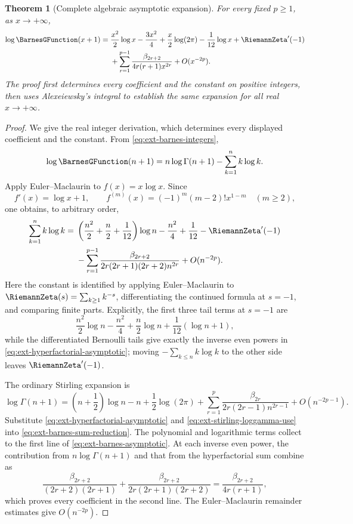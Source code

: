 \documentclass[11pt,a4paper,oneside,openany]{book}
\newtheorem{theorem}{Theorem}[chapter]
\theoremstyle{definition}
\theoremstyle{remark}
\begin{document}
\begin{theorem}[Complete algebraic asymptotic expansion]
\label{thm:ext-barnes-asymptotic}
For every fixed \(p\ge1\), as \(x\to+\infty\),
\begin{align}
 \log \BarnesGFunction(x+1)={}&\frac{x^2}{2}\log x-\frac{3x^2}{4}
 +\frac{x}{2}\log(2\pi)-\frac1{12}\log x+\RiemannZeta'(-1)
 \notag\\
 &+\sum_{r=1}^{p-1}
 \frac{\beta_{2r+2}}{4r(r+1)x^{2r}}
 +O(x^{-2p}).
 \label{eq:ext-barnes-asymptotic}
\end{align}
The proof first determines every coefficient and the constant on positive
integers, then uses Alexeiewsky's integral to establish the same expansion for
all real \(x\to+\infty\).
\end{theorem}
\begin{proof}
We give the real integer derivation, which determines every displayed
coefficient and the constant.  From \eqref{eq:ext-barnes-integers},
\begin{equation}\label{eq:ext-barnes-sum-reduction}
 \log \BarnesGFunction(n+1)=n\log\Gamma(n+1)-\sum_{k=1}^{n}k\log k.
\end{equation}
Apply Euler--Maclaurin to \(f(x)=x\log x\).  Since
\[
 f'(x)=\log x+1,
 \qquad
 f^{(m)}(x)=(-1)^m(m-2)!x^{1-m}\quad(m\ge2),
\]
one obtains, to arbitrary order,
\begin{align}
 \sum_{k=1}^{n}k\log k
 ={}&\left(\frac{n^2}{2}+\frac n2+\frac1{12}\right)\log n
 -\frac{n^2}{4}+\frac1{12}-\RiemannZeta'(-1)
 \notag\\
 &-\sum_{r=1}^{p-1}
 \frac{\beta_{2r+2}}{2r(2r+1)(2r+2)n^{2r}}
 +O(n^{-2p}).
 \label{eq:ext-hyperfactorial-asymptotic}
\end{align}
Here the constant is identified by applying Euler--Maclaurin to
\(\RiemannZeta(s)=\sum_{k\ge1}k^{-s}\), differentiating the continued formula at
\(s=-1\), and comparing finite parts.  Explicitly, the first three tail terms
at \(s=-1\) are
\[
 \frac{n^2}{2}\log n-\frac{n^2}{4}
 +\frac n2\log n+\frac1{12}(\log n+1),
\]
while the differentiated Bernoulli tails give exactly the inverse even powers
in \eqref{eq:ext-hyperfactorial-asymptotic}; moving
\(-\sum_{k\le n}k\log k\) to the other side leaves \(\RiemannZeta'(-1)\).

The ordinary Stirling expansion is
\begin{equation}\label{eq:ext-stirling-loggamma-use}
 \log\Gamma(n+1)=\left(n+\frac12\right)\log n-n
 +\frac12\log(2\pi)
 +\sum_{r=1}^{p}\frac{\beta_{2r}}{2r(2r-1)n^{2r-1}}
 +O(n^{-2p-1}).
\end{equation}
Substitute \eqref{eq:ext-hyperfactorial-asymptotic} and
\eqref{eq:ext-stirling-loggamma-use} into
\eqref{eq:ext-barnes-sum-reduction}.  The polynomial and logarithmic terms
collect to the first line of \eqref{eq:ext-barnes-asymptotic}.  At each inverse
even power, the contribution from \(n\log\Gamma(n+1)\) and that from the
hyperfactorial sum combine as
\[
 \frac{\beta_{2r+2}}{(2r+2)(2r+1)}
 +\frac{\beta_{2r+2}}{2r(2r+1)(2r+2)}
 =\frac{\beta_{2r+2}}{4r(r+1)},
\]
which proves every coefficient in the second line.  The Euler--Maclaurin
remainder estimates give \(O(n^{-2p})\).


\end{proof}
\end{document}

